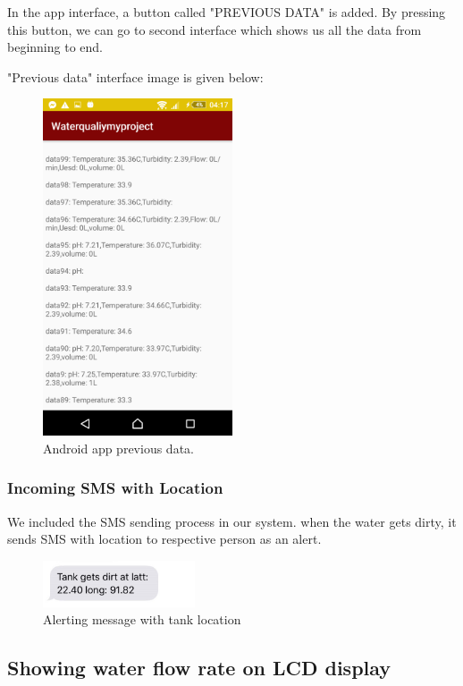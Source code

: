 In the app interface, a button called "PREVIOUS DATA" is added. By pressing this button, we can go to second interface which shows us all the data from beginning to end. 

"Previous data" interface image is given below:
\begin{figure}[H]
\centering
\includegraphics[width=0.5\textwidth]{figures/173292020_499998037660544_1209567427091880898_n.png}
\caption{Android app previous data.}
\label{PreviousDataAndroid}
\end{figure}
\subsubsection*{Incoming SMS with Location}
We included the SMS sending process in our system. when the water gets dirty, it sends SMS with location to respective person as an alert.
\begin{figure}[H]
\centering
\includegraphics[width=0.4\textwidth]{figures/sms.jpg}
\caption{Alerting message with tank location}
\label{AlertMessage}
\end{figure}

\subsection{Showing water flow rate on LCD display}
